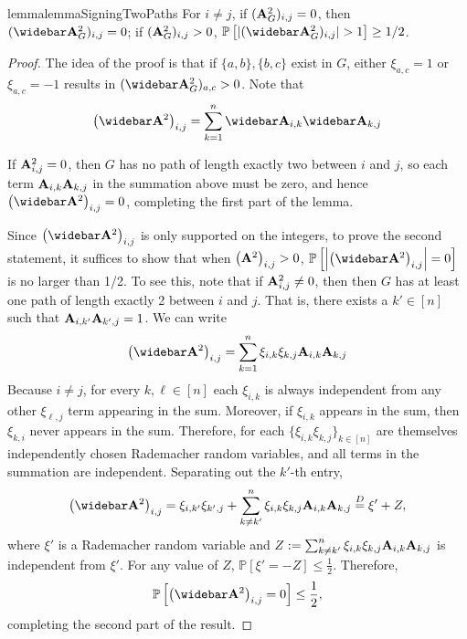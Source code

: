 \begin{restatable}{lemma}{lemmaSigningTwoPaths}\label{lemma:signing_2paths} For $i \neq j$, if $(\mathbf{A}_{G}^2)_{i,j} = 0$, then $(\As_{G}^2)_{i,j} = 0$; if $(\mathbf{A}_G^2)_{i,j} > 0$, $\mathbb{P}\left[\lvert (\As_G^2)_{i,j}\rvert > 1\right] \geq 1/2$. 
\end{restatable}
\begin{proof} 
The idea of the proof is that if $\{a, b\}, \{b, c\}$ exist in $G$, either $\xi_{a,c} = 1$ or $\xi_{a, c} = -1$ results in $(\As_{G}^2)_{a,c} > 0$. Note that 
\begin{align*}
    \left(\As^2\right)_{i,j} = \sum_{k=1}^n \As_{i,k} \As_{k,j}
\end{align*}

If $\mathbf{A}^2_{i,j} = 0$, then $G$ has no path of length exactly two between $i$ and $j$, so each term $\mathbf{A}_{i,k} \mathbf{A}_{k,j}$ in the summation above must be zero, and hence $\left(\As^2\right)_{i,j} = 0$, completing the first part of the lemma.

Since $\left(\Abar^2\right)_{i,j}$ is only supported on the integers, to prove the second statement, it suffices to show that when $\left(\mathbf{A}^2\right)_{i,j} > 0$, $\mathbb{P}\left[\left\lvert \left(\As^2\right)_{i,j}\right\rvert = 0\right]$ is no larger than 1/2. To see this, note that if $\mathbf{A}^2_{i,j} \neq 0$, then then $G$ has at least one path of length exactly 2 between $i$ and $j$. That is, there exists a $k' \in [n]$ such that $\mathbf{A}_{i,k'} \mathbf{A}_{k', j} = 1$. We can write 
\begin{align*}
    \left(\As^2\right)_{i,j} = \sum_{k = 1}^n \xi_{i, k} \xi_{k,j} \A_{i,k} \A_{k,j}
\end{align*}
Because $i \neq j$, for every $k, \ell \in [n]$ each $\xi_{i,k}$ is always independent from any other $\xi_{\ell, j}$ term appearing in the sum. Moreover, if $\xi_{i,k}$ appears in the sum, then $\xi_{k,i}$ never appears in the sum. Therefore, for each $\{\xi_{i, k} \xi_{k,j}\}_{k\in[n]}$ are themselves independently chosen Rademacher random variables, and all terms in the summation are independent. Separating out the $k'$-th entry,
\begin{align*}
    \left(\As^2\right)_{i,j} = \xi_{i, k'} \xi_{k', j} + \sum_{k \neq k'}^n \xi_{i, k} \xi_{k,j} \A_{i,k} \A_{k,j} \overset{D}{=} \xi' + Z, 
\end{align*}
where $\xi'$ is a Rademacher random variable and $Z := \sum_{k \neq k'}^n \xi_{i, k} \xi_{k,j} \mathbf{A}_{i,k} \mathbf{A}_{k,j}$ is independent from $\xi'$. For any value of $Z$, $\mathbb{P}[\xi' = -Z] \leq \frac{1}{2}$. Therefore, 
\begin{align*}
    \mathbb{P}\left[\left(\As^2\right)_{i,j} = 0\right] \leq \frac{1}{2}, 
\end{align*}
completing the second part of the result. 
\end{proof}

